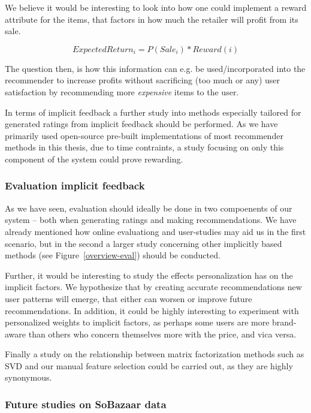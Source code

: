 We believe it would be interesting to look into how one could implement a
reward attribute for the items, that factors in how much the retailer will
profit from its sale.

\begin{equation}
ExpectedReturn_i = P(Sale_i) * Reward(i)
\end{equation}

The question then, is how this information can e.g. be used/incorporated into
the recommender to increase profits without sacrificing (too much or any) user
satisfaction by recommending more \emph{expensive} items to the user.

In terms of implicit feedback a further study into methods especially tailored
for generated ratings from implicit feedback should be performed. As we have
primarily used open-source pre-built implementations of most recommender
methods in this thesis, due to time contraints, a study focusing on only this
component of the system could prove rewarding.


\subsubsection{Evaluation implicit feedback}

As we have seen, evaluation should ideally be done in two compoenents of our
system -- both when generating ratings and making recommendations. We have
already mentioned how online evaluationg and user-studies may aid us in the
first scenario, but in the second a larger study concerning other implicitly
based methods (see Figure~\ref{overview-eval}) should be conducted.

Further, it would be interesting to study the effects personalization has on
the implicit factors. We hypothesize that by creating accurate recommendations
new user patterns will emerge, that either can worsen or improve future
recommendations. In addition, it could be highly interesting to experiment with
personalized weights to implicit factors, as perhaps some users are more
brand-aware than others who concern themselves more with the price, and vica
versa.

Finally a study on the relationship between matrix factorization methods such
as SVD and our manual feature selection could be carried out, as they are
highly synonymous.

\subsubsection{Future studies on SoBazaar data}

